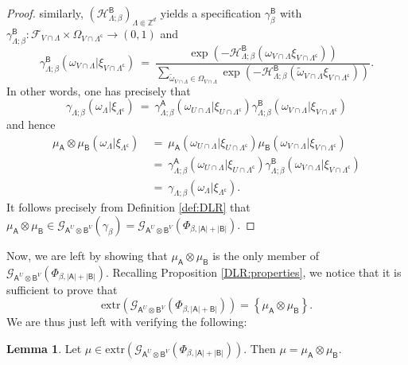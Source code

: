 \documentclass[12pt]{article}
\renewcommand{\AA}{\mathsf{A}}
\newcommand{\AB}{\mathsf{B}}
\newcommand{\F}{\mathcal{F}}
\newcommand{\G}{\mathcal{G}}
\renewcommand{\H}{\mathcal{H}}
\newcommand{\Z}{\mathbb{Z}}
\newcommand{\extr}{\mathrm{extr}}
\newcommand{\set}[1]{\left\{#1\right\}}
\newcommand{\ra}{\rightarrow}
\newcommand{\1}{\mathbbm{1}}
\renewcommand{\c}{\mathsf{c}}
\newcommand{\5}{\vspace{0.5cm}}
\renewcommand{\tilde}{\widetilde}
\theoremstyle{definition}
\newtheorem{lem}[thm]{Lemma}
\begin{document}
\begin{proof}
similarly, $(\H_{\Lambda;\beta}^\AB)_{\Lambda\Subset\Z^d}$ yields a specification $\gamma_\beta^\AB$ with $\gamma_{\Lambda;\beta}^\AB:\F_{V\cap\Lambda}\times\Omega_{V\cap\Lambda^\c}\ra(0,1)$ and
$$\gamma_{\Lambda;\beta}^\AB(\omega_{V\cap\Lambda}|\xi_{V\cap\Lambda^\c}) ~=~ \frac{\exp(-\H_{\Lambda;\beta}^{\AB}(\omega_{V\cap\Lambda}\xi_{V\cap\Lambda^\c}))}{\sum_{\tilde{\omega}_{V\cap\Lambda}\in\Omega_{V\cap\Lambda}}\exp(-\H_{\Lambda;\beta}^{\AB}(\tilde{\omega}_{V\cap\Lambda}\xi_{V\cap\Lambda^\c}))}.$$
In other words, one has precisely that
$$\gamma_{\Lambda;\beta}(\omega_\Lambda|\xi_{\Lambda^\c}) ~=~ \gamma_{\Lambda;\beta}^\AA(\omega_{U\cap\Lambda}|\xi_{U\cap\Lambda^\c})\gamma_{\Lambda;\beta}^\AB(\omega_{V\cap\Lambda}|\xi_{V\cap\Lambda^\c})$$
and hence
\begin{align*}
\mu_\AA\otimes\mu_\AB(\omega_\Lambda|\xi_{\Lambda^\c}) ~&=~ \mu_\AA(\omega_{U\cap\Lambda}|\xi_{U\cap\Lambda^\c})\mu_\AB(\omega_{V\cap\Lambda}|\xi_{V\cap\Lambda^\c}) \\
&=~ \gamma_{\Lambda;\beta}^\AA(\omega_{U\cap\Lambda}|\xi_{U\cap\Lambda^\c})\gamma_{\Lambda;\beta}^\AB(\omega_{V\cap\Lambda}|\xi_{V\cap\Lambda^\c}) \\
&=~ \gamma_{\Lambda;\beta}(\omega_\Lambda|\xi_{\Lambda^\c}).
\end{align*}
It follows precisely from Definition \ref{def:DLR} that $\mu_\AA\otimes\mu_\AB\in\G_{\AA^U\otimes\AB^V}(\gamma_\beta)=\G_{\AA^U\otimes\AB^V}(\Phi_{\beta,|\AA|+|\AB|})$.
\end{proof}

Now, we are left by showing that $\mu_\AA\otimes\mu_\AB$ is the only member of $\G_{\AA^U\otimes\AB^V}(\Phi_{\beta,|\AA|+|\AB|})$. Recalling Proposition \ref{DLR:properties}, we notice that it is sufficient to prove that 
$$\extr(\G_{\AA^U\otimes\AB^V}(\Phi_{\beta,|\AA|+\AB|}))=\set{\mu_\AA\otimes\mu_\AB}.$$
We are thus just left with verifying the following:
\begin{lem}
Let $\mu\in\extr(\G_{\AA^U\otimes\AB^V}(\Phi_{\beta,|\AA|+|\AB|}))$. Then $\mu=\mu_\AA\otimes\mu_\AB$.
\end{lem}
\end{document}
